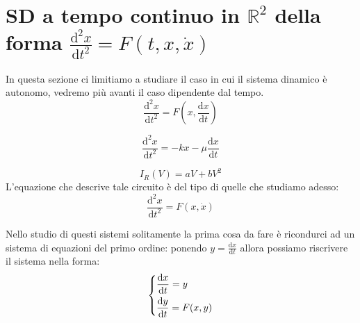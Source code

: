 \section{SD a tempo continuo in $\mathbb{R}^2$  della forma $\frac{\text{d}^2x}{\text{d} t^2} = F(t, x, \dot{x})$}%
\label{sub:SD a tempo continuo in   della forma}
In questa sezione ci limitiamo a studiare il caso in cui il sistema dinamico è autonomo, vedremo più avanti il caso dipendente dal tempo.
\[
    \frac{\text{d} ^2x}{\text{d} t^2} = F(x, \frac{\text{d} x}{\text{d} t} )
\] 
\begin{exmp}
    \[
	\frac{\text{d} ^2x}{\text{d} t^2} = -k x - \mu\frac{\text{d} x}{\text{d} t} 
    \] 
\end{exmp}
\noindent
\begin{exmp}
    \[
	I_R(V)=aV+bV^2
    \] 
    L'equazione che descrive tale circuito è del tipo di quelle che studiamo adesso:
    \[
	\frac{\text{d} ^2x}{\text{d} t^2} = F(x, \dot{x})
    \] 
\end{exmp}
\noindent
Nello studio di questi sistemi solitamente la prima cosa da fare è ricondurci ad un sistema di equazioni del primo ordine: ponendo $y = \frac{\text{d} x}{\text{d} t} $  allora possiamo riscrivere il sistema nella forma:
\[\begin{dcases}
    \frac{\text{d} x}{\text{d} t} = y\\
    \frac{\text{d} y}{\text{d} t} = F(x,y)
\end{dcases}\] 

